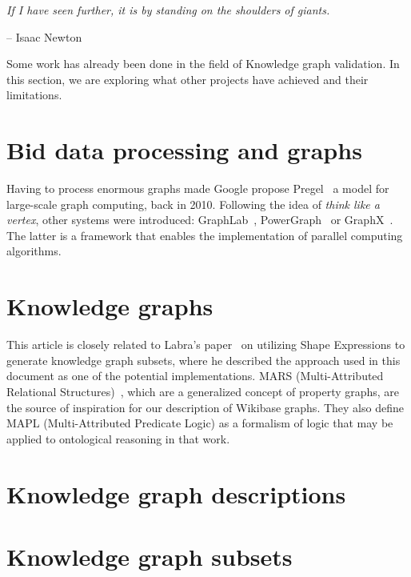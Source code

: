 \epigraph{\textit{If I have seen further, it is by standing on the shoulders of giants.}}{-- \textup{Isaac Newton}}

Some work has already been done in the field of Knowledge graph validation. In this section, we are exploring what other projects have achieved and their limitations.

\section{Bid data processing and graphs}

Having to process enormous graphs made Google propose Pregel~\cite{10.1145/1807167.1807184} a model for large-scale graph computing, back in 2010. Following the idea of \textit{think like a vertex}, other systems were introduced: GraphLab~\cite{10.14778/2212351.2212354}, PowerGraph~\cite{180251} or GraphX~\cite{186216}. The latter is a framework that enables the implementation of parallel computing algorithms.

\section{Knowledge graphs}

This article is closely related to Labra's paper~\cite{https://doi.org/10.48550/arxiv.2110.11709} on utilizing Shape Expressions to generate knowledge graph subsets, where he described the approach used in this document as one of the potential implementations. MARS (Multi-Attributed Relational Structures)~\cite{ijcai2017p165}, which are a generalized concept of property graphs, are the source of inspiration for our description of Wikibase graphs. They also define MAPL (Multi-Attributed Predicate Logic) as a formalism of logic that may be applied to ontological reasoning in that work.

\section{Knowledge graph descriptions}

\section{Knowledge graph subsets}